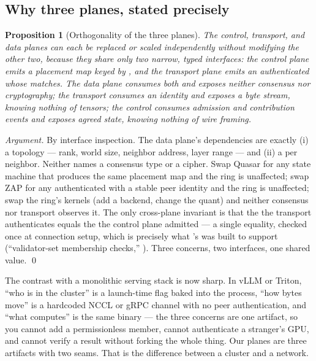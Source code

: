 \documentclass[11pt]{article}
\newtheorem{proposition}{Proposition}
\begin{document}
\subsection{Why three planes, stated precisely}
\label{sec:whythree}

\begin{proposition}[Orthogonality of the three planes]
\label{prop:ortho}
The control, transport, and data planes can each be replaced or scaled independently without
modifying the other two, because they share only two narrow, typed interfaces: the control plane
emits a \emph{placement map} keyed by , and the transport plane emits an
authenticated  whose  matches. The data plane consumes both and
exposes neither consensus nor cryptography; the transport consumes an identity and exposes a
byte stream, knowing nothing of tensors; the control consumes admission and contribution events
and exposes agreed state, knowing nothing of wire framing.
\end{proposition}

\begin{proof}[Argument]
By interface inspection. The data plane's dependencies are exactly (i) a topology --- rank,
world size, neighbor address, layer range --- and (ii) a  per neighbor. Neither
names a consensus type or a cipher. Swap Quasar for any state machine that produces the same
placement map and the ring is unaffected; swap ZAP for any authenticated  with a
stable peer identity and the ring is unaffected; swap the ring's kernels (add a backend, change
the quant) and neither consensus nor transport observes it. The only cross-plane invariant is
that the  the transport authenticates equals the  the control plane
admitted --- a single equality, checked once at connection setup, which is precisely what
's  was built to support (``validator-set membership checks,''
). Three concerns, two interfaces, one shared value. \qed
\end{proof}

The contrast with a monolithic serving stack is now sharp. In vLLM or Triton, ``who is in the
cluster'' is a launch-time flag baked into the process, ``how bytes move'' is a hardcoded NCCL
or gRPC channel with no peer authentication, and ``what computes'' is the same binary --- the
three concerns are one artifact, so you cannot add a permissionless member, cannot authenticate
a stranger's GPU, and cannot verify a result without forking the whole thing. Our planes are
three artifacts with two seams. That is the difference between a cluster and a network.
\end{document}
